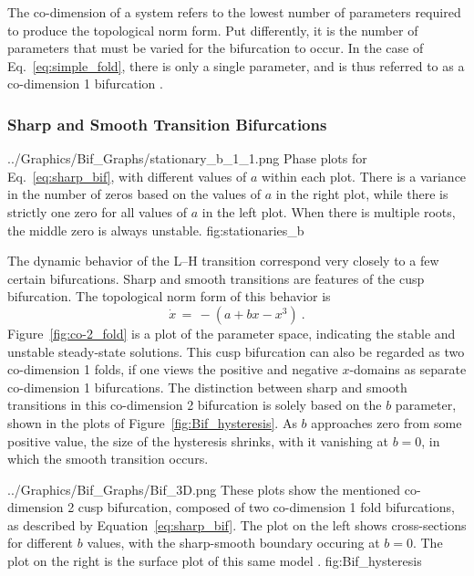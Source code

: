 The co-dimension of a system refers to the lowest number of parameters required to produce the topological norm form.
Put differently, it is the number of parameters that must be varied for the bifurcation to occur.
In the case of Eq.~\ref{eq:simple_fold}, there is only a single parameter, and is thus referred to as a co-dimension 1 bifurcation \cite{weymiens_bifurcation_2014}.

\subsubsection{Sharp and Smooth Transition Bifurcations}
	{../Graphics/Bif_Graphs/stationary_b_1_1.png}
	{Phase plots for Eq.~\ref{eq:sharp_bif}, with different values of $a$ within each plot. %
	There is a variance in the number of zeros based on the values of $a$ in the right plot, while there is strictly one zero for all values of $a$ in the left plot. %
	When there is multiple roots, the middle zero is always unstable.}
	{fig:stationaries_b}

The dynamic behavior of the L--H transition correspond very closely to a few certain bifurcations.
Sharp and smooth transitions are features of the cusp bifurcation.
The topological norm form of this behavior is
\begin{equation}
	\dot{x} \,=\, -(a + bx - x^3)~.
	\label{eq:sharp_bif}
\end{equation}
Figure~\ref{fig:co-2_fold} is a plot of the parameter space, indicating the stable and unstable steady-state solutions.
This cusp bifurcation can also be regarded as two co-dimension 1 folds, if one views the positive and negative $x$-domains as separate co-dimension 1 bifurcations.
The distinction between sharp and smooth transitions in this co-dimension 2 bifurcation is solely based on the $b$ parameter, shown in the plots of Figure~\ref{fig:Bif_hysteresis}.
As $b$ approaches zero from some positive value, the size of the hysteresis shrinks, with it vanishing at $b = 0$, in which the smooth transition occurs.

	{../Graphics/Bif_Graphs/Bif_3D.png}
	{These plots show the mentioned co-dimension 2 cusp bifurcation, composed of two co-dimension 1 fold bifurcations, as described by Equation~\ref{eq:sharp_bif}.
	The plot on the left shows cross-sections for different $b$ values, with the sharp-smooth boundary occuring at $b = 0$.
	The plot on the right is the surface plot of this same model \cite{weymiens_bifurcation_2014}.}
	{fig:Bif_hysteresis}

